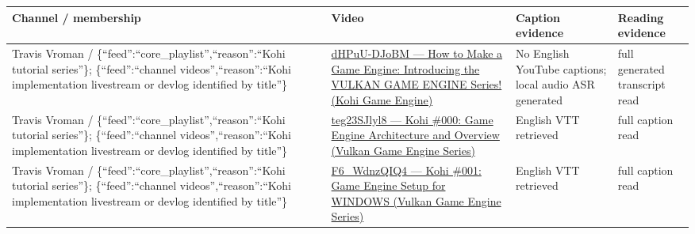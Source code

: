 \documentclass[11pt]{book}
\begin{document}
\begin{longtable}[]{@{}
  >{\raggedright\arraybackslash}p{}
  >{\raggedright\arraybackslash}p{}
  >{\raggedright\arraybackslash}p{}
  >{\raggedright\arraybackslash}p{}@{}}
\toprule\noalign{}
\begin{minipage}[b]{\linewidth}\raggedright
Channel / membership
\end{minipage} & \begin{minipage}[b]{\linewidth}\raggedright
Video
\end{minipage} & \begin{minipage}[b]{\linewidth}\raggedright
Caption evidence
\end{minipage} & \begin{minipage}[b]{\linewidth}\raggedright
Reading evidence
\end{minipage} \\
\midrule\noalign{}
\endhead
Travis Vroman / \{``feed'':\allowbreak{}``core\_\allowbreak{}playlist'',\allowbreak{}``reason'':\allowbreak{}``Kohi tutorial series''\}; \{``feed'':\allowbreak{}``channel videos'',\allowbreak{}``reason'':\allowbreak{}``Kohi implementation livestream or devlog identified by title''\} & \href{https://www.youtube.com/watch?v=dHPuU-DJoBM}{dHPuU-DJoBM --- How to Make a Game Engine: Introducing the VULKAN GAME ENGINE Series! (Kohi Game Engine)} & No English YouTube captions; local audio ASR generated & full generated transcript read \\
Travis Vroman / \{``feed'':\allowbreak{}``core\_\allowbreak{}playlist'',\allowbreak{}``reason'':\allowbreak{}``Kohi tutorial series''\}; \{``feed'':\allowbreak{}``channel videos'',\allowbreak{}``reason'':\allowbreak{}``Kohi implementation livestream or devlog identified by title''\} & \href{https://www.youtube.com/watch?v=teg23SJlyl8}{teg23SJlyl8 --- Kohi \#000: Game Engine Architecture and Overview (Vulkan Game Engine Series)} & English VTT retrieved & full caption read \\
Travis Vroman / \{``feed'':\allowbreak{}``core\_\allowbreak{}playlist'',\allowbreak{}``reason'':\allowbreak{}``Kohi tutorial series''\}; \{``feed'':\allowbreak{}``channel videos'',\allowbreak{}``reason'':\allowbreak{}``Kohi implementation livestream or devlog identified by title''\} & \href{https://www.youtube.com/watch?v=F6_WdnzQIQ4}{F6\_WdnzQIQ4 --- Kohi \#001: Game Engine Setup for WINDOWS (Vulkan Game Engine Series)} & English VTT retrieved & full caption read \\
\end{longtable}
\end{document}
